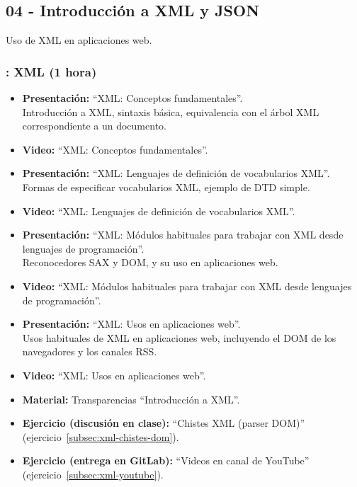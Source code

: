 \documentclass[a4paper,12pt]{article}
\begin{document}
\subsection{04 - Introducción a XML y JSON}

Uso de XML en aplicaciones web.

\subsubsection{\martesI: XML (1 hora)}

\begin{itemize}
\item \textbf{Presentación:} ``XML: Conceptos fundamentales''. \\
  Introducción a XML, sintaxis básica, equivalencia con el árbol XML correspondiente a un documento.
\item \textbf{Video:} ``XML: Conceptos fundamentales''.

\item \textbf{Presentación:} ``XML: Lenguajes de definición de vocabularios XML''. \\
  Formas de especificar vocabularios XML, ejemplo de DTD simple.
\item \textbf{Video:} ``XML: Lenguajes de definición de vocabularios XML''.
\item \textbf{Presentación:} ``XML: Módulos habituales para trabajar con XML desde lenguajes de programación''. \\
  Reconocedores SAX y DOM, y su uso en aplicaciones web.
\item \textbf{Video:} ``XML: Módulos habituales para trabajar con XML desde lenguajes de programación''.
\item \textbf{Presentación:} ``XML: Usos en aplicaciones web''. \\
  Usos habituales de XML en aplicaciones web, incluyendo el DOM de los navegadores y los canales RSS.
\item \textbf{Video:} ``XML: Usos en aplicaciones web''.
\item \textbf{Material:} Transparencias ``Introducción a XML''.
\item \textbf{Ejercicio (discusión en clase):} ``Chistes XML (parser DOM)'' (ejercicio~\ref{subsec:xml-chistes-dom}).
\item \textbf{Ejercicio (entrega en GitLab):} ``Videos en canal de YouTube'' (ejercicio~\ref{subsec:xml-youtube}).
\end{itemize}
\end{document}
